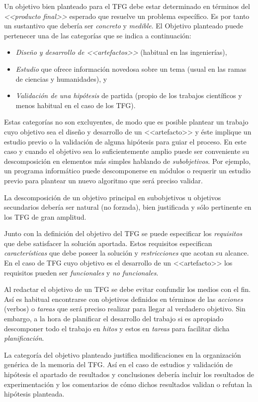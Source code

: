 Un objetivo bien planteado para el TFG debe estar determinado en términos del \emph{<<producto final>>} esperado que resuelve un problema específico. Es por tanto un sustantivo que debería ser \emph{concreto} y \emph{medible}. El \textsf{Objetivo} planteado puede pertenecer una de las categorías que se indica a continuación:
\begin{itemize}
	\item \emph{Diseño y desarrollo de <<artefactos>>} 
	(habitual en las ingenierías),
	\item \emph{Estudio} que ofrece información novedosa sobre un tema (usual en las ramas de ciencias y humanidades), y
	\item \emph{Validación de una 
	hipótesis} de partida (propio de los trabajos 
	científicos y menos habitual en el caso de los TFG).
\end{itemize}

Estas categorías no son excluyentes, de modo que es posible plantear un trabajo cuyo objetivo sea el diseño y desarrollo de un <<artefacto>> y éste implique un estudio previo o la validación de alguna hipótesis para guiar el proceso. En este caso y cuando el objetivo sea lo suficientemente amplio puede ser conveniente su descomposición en elementos más simples hablando de \emph{subobjetivos}. Por ejemplo, un programa informático puede descomponerse en módulos o requerir un estudio previo para plantear un nuevo algoritmo que será preciso validar. 

La descomposición de un objetivo principal en subobjetivos 
u objetivos secundarios debería ser natural (no forzada), bien justificada y 
sólo pertinente en los TFG de gran amplitud.

Junto con la definición del objetivo del TFG se puede especificar los \emph{requisitos} que debe satisfacer la solución aportada. Estos requisitos especifican \emph{características} que debe poseer la solución y \emph{restricciones} que acotan su alcance. En el caso de TFG cuyo objetivo es el desarrollo de un <<artefacto>> los requisitos pueden ser \emph{funcionales} y \emph{no funcionales}.

Al redactar el objetivo de un TFG se debe evitar confundir los medios con el 
fin. Así es habitual encontrarse con objetivos definidos en términos de las 
\emph{acciones} (verbos) o \emph{tareas} que será preciso 
realizar para llegar al verdadero objetivo. Sin embargo, a la hora de 
planificar el desarrollo del trabajo si es apropiado descomponer todo el 
trabajo en \emph{hitos} y estos en \emph{tareas} para facilitar dicha 
\emph{planificación}.


La categoría del objetivo planteado justifica modificaciones en la organización genérica de la memoria del TFG. Así en el caso de estudios y validación de hipótesis el apartado de resultados y conclusiones debería incluir los resultados de experimentación y los comentarios de cómo dichos resultados validan o refutan la hipótesis planteada.

